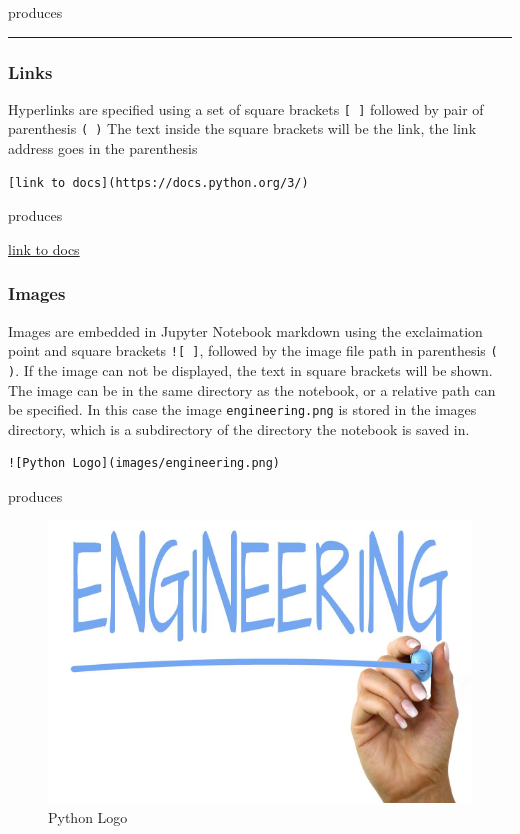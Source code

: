 \documentclass{book}
\makeatletter
\def\maxwidth{\ifdim\Gin@nat@width>\linewidth\linewidth
    \else\Gin@nat@width\fi}
\let\Oldincludegraphics\includegraphics
\renewcommand{\includegraphics}[1]{\Oldincludegraphics[width=.8\maxwidth]{#1}}
\makeatother
\begin{document}
produces

\begin{center}\rule{0.5\linewidth}{\linethickness}\end{center}

\subsubsection{Links}\label{links}

Hyperlinks are specified using a set of square brackets \lstinline![ ]!
followed by pair of parenthesis \lstinline!( )! The text inside the
square brackets will be the link, the link address goes in the
parenthesis

\begin{lstlisting}
[link to docs](https://docs.python.org/3/)
\end{lstlisting}

produces

\href{https://docs.python.org/3/}{link to docs}

\subsubsection{Images}\label{images}

Images are embedded in Jupyter Notebook markdown using the exclaimation
point and square brackets \lstinline"![ ]", followed by the image file
path in parenthesis \lstinline!( )!. If the image can not be displayed,
the text in square brackets will be shown. The image can be in the same
directory as the notebook, or a relative path can be specified. In this
case the image \lstinline!engineering.png! is stored in the images
directory, which is a subdirectory of the directory the notebook is
saved in.

\begin{lstlisting}
![Python Logo](images/engineering.png)
\end{lstlisting}

produces

\begin{figure}
\centering
\includegraphics{images/engineering.png}
\caption{Python Logo}
\end{figure}
\end{document}
